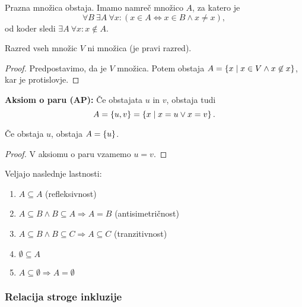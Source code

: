\documentclass[12pt, a4paper]{article}
\renewcommand{\implies}{\Rightarrow}
\renewcommand{\iff}{\Leftrightarrow}
\begin{document}
\begin{posledica}
Prazna množica obstaja. Imamo namreč množico $A$, za katero je
\[
\forall B~\exists A~\forall x\colon(x\in A\iff x\in B\land x\ne x),
\]
od koder sledi $\exists A~\forall x\colon x\not\in A$.
\end{posledica}

\begin{posledica}
Razred vseh množic $V$ ni množica (je pravi razred).
\end{posledica}

\begin{proof}
Predpostavimo, da je $V$ množica. Potem obstaja $A=\left\{x\mid x\in V\land x\not\in x\right\}$, kar je protislovje.
\end{proof}

\begin{okvir}
\textbf{Aksiom o paru (AP):} Če obstajata $u$ in $v$, obstaja tudi
\[
A=\left\{u,v\right\}=\left\{x\mid x=u\lor x=v\right\}.
\]
\end{okvir}

\begin{posledica}
Če obstaja $u$, obstaja $A=\left\{u\right\}$.
\end{posledica}

\begin{proof}
V aksiomu o paru vzamemo $u=v$.
\end{proof}

\begin{izrek}
Veljajo naslednje lastnosti:

\begin{enumerate}[label=(\roman*)]
\item $A\subseteq A$ (refleksivnost)
\item $A\subseteq B\land B\subseteq A\implies A=B$ (antisimetričnost)
\item $A\subseteq B\land B\subseteq C\implies A\subseteq C$ (tranzitivnost)
\item $\emptyset\subseteq A$
\item $A\subseteq\emptyset\implies A=\emptyset$
\end{enumerate}
\end{izrek}

\obvs

\newpage

\subsubsection{Relacija stroge inkluzije}
\end{document}

